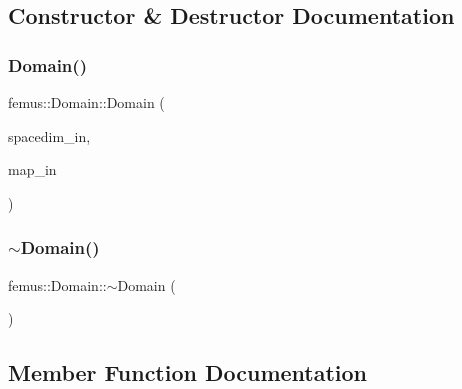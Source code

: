 \subsection{Constructor \& Destructor Documentation}
\mbox{\label{classfemus_1_1_domain_a96de5a99af1bea80aeb1d21cea9ca362}} 
\subsubsection{\texorpdfstring{Domain()}{Domain()}}
{\footnotesize\ttfamily femus\+::\+Domain\+::\+Domain (\begin{DoxyParamCaption}\item[{const \mbox{\hyperlink{_typedefs_8hpp_a91ad9478d81a7aaf2593e8d9c3d06a14}{uint}}}]{spacedim\+\_\+in,  }\item[{const \mbox{\hyperlink{classfemus_1_1_femus_input_parser}{Femus\+Input\+Parser}}$<$ double $>$ \&}]{map\+\_\+in }\end{DoxyParamCaption})\hspace{0.3cm}{\ttfamily [protected]}}

\mbox{\label{classfemus_1_1_domain_ad1b0f07867cc3aee73de7fba251abc50}} 
\subsubsection{\texorpdfstring{$\sim$\+Domain()}{~Domain()}}
{\footnotesize\ttfamily femus\+::\+Domain\+::$\sim$\+Domain (\begin{DoxyParamCaption}{ }\end{DoxyParamCaption})}



\subsection{Member Function Documentation}
\mbox{\label{classfemus_1_1_domain_ad75eacc25142ba41cbceab06de675fc8}} 
